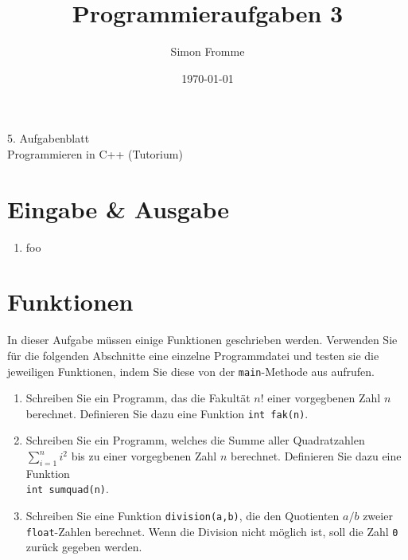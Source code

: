 \documentclass[paper=a4, fontsize=11pt, twoside]{scrartcl}
\title{Programmieraufgaben 3}
\author{Simon Fromme}
\date{\normalsize\today}
\begin{document}
\vspace*{0.75\baselineskip}
\begin{center}
  \Large 5. Aufgabenblatt \\\vspace{0.5em} \large Programmieren in C++ (Tutorium)
\end{center}


\section*{Eingabe \& Ausgabe}
\begin{enumerate}
\item foo
\end{enumerate}

\section*{Funktionen}\label{sec:funktionen}
In dieser Aufgabe müssen einige Funktionen geschrieben werden. Verwenden Sie für die folgenden Abschnitte eine einzelne Programmdatei und testen sie die jeweiligen Funktionen, indem Sie diese von der \texttt{main}-Methode aus aufrufen.
\begin{enumerate}[resume]
\item Schreiben Sie ein Programm, das die Fakultät $n!$ einer vorgegbenen Zahl $n$ berechnet. Definieren Sie dazu eine Funktion \texttt{int fak(n)}. 
  \item Schreiben Sie ein Programm, welches die Summe aller Quadratzahlen $\sum\limits_{i=1}^{n}i^2$ bis zu einer vorgegbenen Zahl $n$ berechnet. Definieren Sie dazu eine Funktion \\ \texttt{int sumquad(n)}.
  \item Schreiben Sie eine Funktion \texttt{division(a,b)}, die den Quotienten $a/b$ zweier \texttt{float}-Zahlen berechnet. Wenn die Division nicht möglich ist, soll die Zahl \texttt{0} zurück gegeben werden.\label{item:division}
\end{enumerate}
\end{document}
